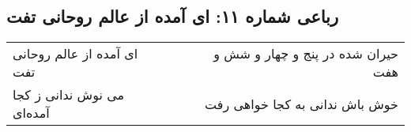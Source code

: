 \begin{center}
\section*{رباعی شماره ۱۱: ای آمده از عالم روحانی تفت}
\label{sec:sh011}
\begin{longtable}{l p{0.5cm} r}
ای آمده از عالم روحانی تفت
&&
حیران شده در پنج و چهار و شش و هفت
\\
می نوش ندانی ز کجا آمده‌ای
&&
خوش باش ندانی به کجا خواهی رفت
\\
\end{longtable}
\end{center}
